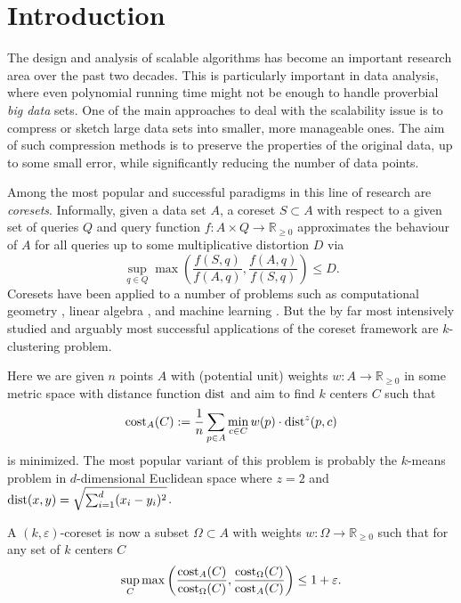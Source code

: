 \section{Introduction}

The design and analysis of scalable algorithms has become an important research area over the past two decades. This is particularly important in data analysis, where even polynomial running time might not be enough to handle proverbial \emph{big data} sets.
One of the main approaches to deal with the scalability issue is to compress or sketch large data sets into smaller, more manageable ones. The aim of such compression methods is to preserve the properties of the original data, up to some small error, while significantly reducing the number of data points.

Among the most popular and successful paradigms in this line of research are \emph{coresets}. Informally, given a data set $A$, a coreset $S\subset A$ with respect to a given set of queries $Q$ and query function $f: A\times Q \rightarrow \mathbb{R}_{\geq 0}$ approximates the behaviour of $A$ for all queries up to some multiplicative distortion $D$ via
$$ \sup_{q\in Q} \max\left( \frac{f(S,q)}{f(A,q)},\frac{f(A,q)}{f(S,q)}\right) \leq D.$$
Coresets have been applied to a number of problems such as computational geometry \cite{AHV05,Chan09}, linear algebra \cite{IndykMGR20,maalouf2019fast}, and machine learning \cite{MRM21,MunteanuSSW18}. But the by far most intensively studied and arguably most successful applications of the coreset framework are $k$-clustering problem.

Here we are given $n$ points $A$ with (potential unit) weights $w:A\rightarrow \mathbb{R}_{\geq 0}$ in some metric space with distance function $\text{dist}$ and aim to find $k$ centers $C$ such that $$\text{cost}_A(C):= \frac{1}{n} \sum_{p\in A}  \min_{c\in C} w(p)\cdot \text{dist}^z(p,c)$$
is minimized. The most popular variant of this problem is probably the $k$-means problem in $d$-dimensional Euclidean space where $z=2$ and $\text{dist}(x,y) = \sqrt{\sum_{i=1}^d (x_i-y_i)^2}$.

A $(k,\varepsilon)$-coreset is now a subset $\Omega\subset A$ with weights $w:\Omega\rightarrow \mathbb{R}_{\geq 0}$ such that for any set of $k$ centers $C$
\begin{equation}
\label{eq:coreset}
\sup_{C} \max\left( \frac{\text{cost}_A(C)}{\text{cost}_{\Omega}(C)},\frac{\text{cost}_{\Omega}(C)}{\text{cost}_{A}(C)}\right) \leq 1+\varepsilon.
\end{equation}

